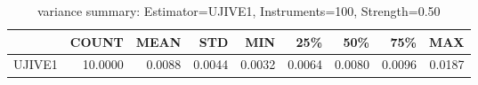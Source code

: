 \begin{table}[ht]
\centering
\caption{variance summary: Estimator=UJIVE1, Instruments=100, Strength=0.50}
\begin{tabular}{lrrrrrrrr}
\toprule
 & COUNT & MEAN & STD & MIN & 25\% & 50\% & 75\% & MAX \\
\midrule
UJIVE1 & 10.0000 & 0.0088 & 0.0044 & 0.0032 & 0.0064 & 0.0080 & 0.0096 & 0.0187 \\
\bottomrule
\end{tabular}
\end{table}
